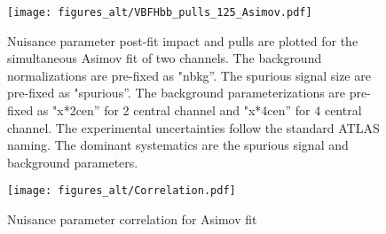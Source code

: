 %


\begin{figure}[htbp]
  \centering
 \texttt{[image: figures\_alt/VBFHbb\_pulls\_125\_Asimov.pdf]}

\caption{Nuisance parameter post-fit impact and pulls are plotted for the simultaneous Asimov fit of two channels. The background normalizations are pre-fixed as "nbkg''. The spurious signal size are pre-fixed as "spurious''. The background parameterizations are pre-fixed as  "x*2cen'' for 2 central channel and "x*4cen'' for 4 central channel. The experimental uncertainties follow the standard ATLAS naming. The dominant systematics are the spurious signal and background parameters.}
  \label{fig:pull_asimov}
\end{figure}


\begin{figure}[htbp]
  \centering
 \texttt{[image: figures\_alt/Correlation.pdf]}

\caption{Nuisance parameter correlation for Asimov fit}
  \label{fig:corr_asimov}
\end{figure}


%
